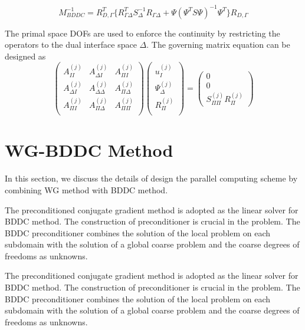  \begin{equation}
 M_{BDDC}^{-1} = R_{D, \Gamma}^{T} \{ R_{\Gamma \Delta}^{T} S^{-1}_{\Delta} R_{\Gamma \Delta} + \Psi (\Psi^{T} S \Psi)^{-1} \Psi^{T} \} R_{D, \Gamma}
 \end{equation}
 
 The primal space DOFs are used to enforce the continuity by restricting the operators to the dual interface space $ \Delta $. The governing matrix equation can be designed as
 \begin{equation}
 \begin{pmatrix}
 A_{II}^{(j)} & A_{\Delta I}^{(j)} & A^{(j)}_{\Pi I} \\
 A_{\Delta I}^{(j)} & A_{\Delta \Delta}^{(j)} & A_{\Pi \Delta}^{(j)} \\
 A_{\Pi I}^{(j)} & A_{\Pi \Delta}^{(j)} & A_{\Pi \Pi}^{(j)} \\
 \end{pmatrix} \begin{pmatrix}
 u_{I}^{(j)} \\ \Psi_{\Delta}^{(j)} \\ R_{\Pi}^{(j)} \\
 \end{pmatrix} = \begin{pmatrix}
 0 \\ 0 \\ S_{\Pi \Pi}^{(j)} R_{\Pi}^{(j)}
 \end{pmatrix}
 \end{equation}

\section{WG-BDDC Method}
In this section, we discuss the details of design the parallel computing scheme by combining WG method with BDDC method. 

The preconditioned conjugate gradient method is adopted as the linear solver for BDDC method. The construction of preconditioner is crucial in the problem. The BDDC preconditioner combines the solution of the local problem on each subdomain with the solution of a global coarse problem and the coarse degrees of freedoms as unknowns. 

The preconditioned conjugate gradient method is adopted as the linear solver for BDDC method. The construction of preconditioner is crucial in the problem. The BDDC preconditioner combines the solution of the local problem on each subdomain with the solution of a global coarse problem and the coarse degrees of freedoms as unknowns. 

